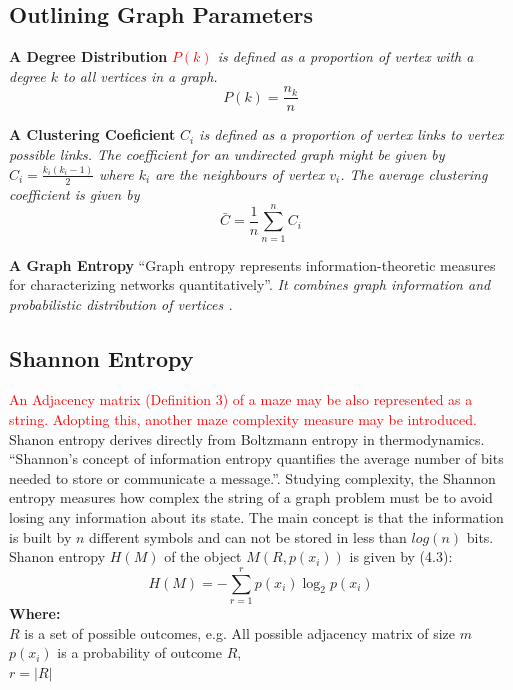 \subsection{Outlining Graph Parameters}
\begin{definition}\textbf{A Degree Distribution} \emph{\textcolor{red}{$P(k)$} is defined as a proportion of vertex with a degree $k$ to all vertices in a graph.}
\begin{equation}
P(k) = \frac{n_k}{n}
\end{equation}
\end{definition}
\begin{definition}\textbf{A Clustering Coeficient} \emph{$C_i$ is defined as a proportion of vertex links to vertex possible links. The coefficient for an undirected graph might be given by $C_i = \frac{k_i(k_i-1)}{2}$ where $k_i$ are the neighbours of vertex $v_i$. The average clustering coefficient is given by}
\begin{equation}
\bar{C} = \frac{1}{n}\sum_{n = 1}^{n} C_i
\end{equation}
\end{definition}
\begin{definition}\textbf{A Graph Entropy} “Graph entropy represents information-theoretic measures for characterizing networks quantitatively”\cite{12}.
\emph{It combines graph information and probabilistic distribution of vertices \cite{13}.}\end{definition}
\subsection{Shannon Entropy}
\textcolor{red}{An Adjacency matrix (Definition 3) of a maze may be also represented as a string. Adopting this, another maze complexity measure may be introduced.}
Shanon entropy derives directly from Boltzmann entropy in thermodynamics. “Shannon’s concept of information entropy quantifies the average number of bits needed to store or communicate a message.”\cite{11}. Studying complexity, the Shannon entropy measures how complex the string of a graph problem must be to avoid losing any information about its state. The main concept is that the information is built by $n$ different symbols and can not be stored in less than $log(n)$ bits.
Shanon entropy $H(M)$ of the object $M(R, p(x_i))$ is given by (4.3)\cite{11}:
\begin{equation}
H(M) = - \sum_{r = 1}^{r} p(x_i)\log_2 p(x_i)
\end{equation}
\textbf{Where:}\\
$R$ is a set of possible outcomes, e.g.  All possible adjacency matrix of size $m$\\
$p(x_i)$ is a probability of outcome $R$,\\
$r= |R|$\\
